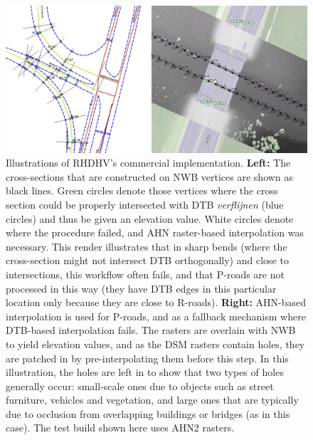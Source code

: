 \begin{figure}[h]
    \centering
    \includegraphics[width=\linewidth]{p2/figs/rhdhv_combined.png}
    \caption{Illustrations of RHDHV's commercial implementation. \textbf{Left:} The cross-sections that are constructed on NWB vertices are shown as black lines. Green circles denote those vertices where the cross section could be properly intersected with DTB \textit{verflijnen} (blue circles) and thus be given an elevation value. White circles denote where the procedure failed, and AHN raster-based interpolation was necessary. This render illustrates that in sharp bends (where the cross-section might not intersect DTB orthogonally) and close to intersections, this workflow often fails, and that P-roads are not processed in this way (they have DTB edges in this particular location only because they are close to R-roads). \textbf{Right:} AHN-based interpolation is used for P-roads, and as a fallback mechanism where DTB-based interpolation fails. The rasters are overlain with NWB to yield elevation values, and as the DSM rasters contain holes, they are patched in by pre-interpolating them before this step. In this illustration, the holes are left in to show that two types of holes generally occur: small-scale ones due to objects such as street furniture, vehicles and vegetation, and large ones that are typically due to occlusion from overlapping buildings or bridges (as in this case). The test build shown here uses AHN2 rasters.}
    \label{fig:rhdhv}
\end{figure}

